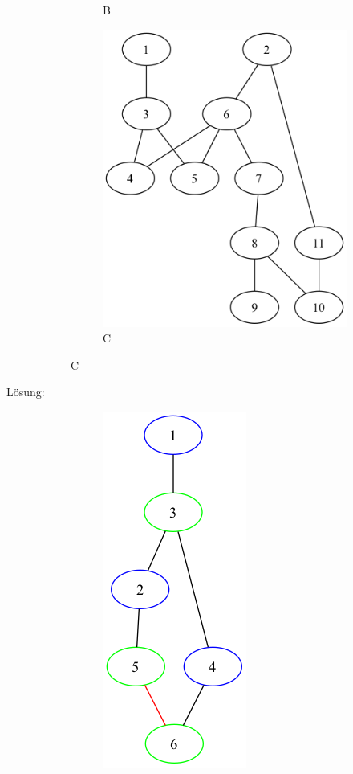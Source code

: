 \documentclass[a4paper,11pt]{report}
\begin{document}
\begin{description}
\begin{figure}[htbp]
\begin{subfigure}[b]{0.3\textwidth}
                \caption{B}
                \label{fig:a01_b}
            \end{subfigure}
            \hfill
            \begin{subfigure}[b]{0.3\textwidth}
                \includegraphics[height=0.2\textheight]{images/C}
                \caption{C}
                \label{fig:a01_c}
            \end{subfigure}
            \hfill
        \end{figure}
        \item[Lösung:] \hfill \newline %
        \begin{figure}[htbp]
            \centering
            \begin{subfigure}[b]{0.3\textwidth}
                \includegraphics[height=0.2\textheight]{images/A_colored}

\end{subfigure}
\end{figure}
\end{description}
\end{document}
